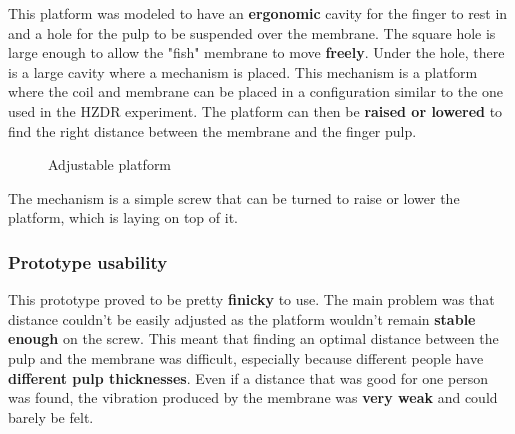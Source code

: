 This platform was modeled to have an \textbf{ergonomic} cavity for the finger to rest in and a hole for the pulp to be suspended over the membrane.
The square hole is large enough to allow the "fish" membrane to move \textbf{freely}.
Under the hole, there is a large cavity where a mechanism is placed.
This mechanism is a platform where the coil and membrane can be placed in a configuration similar to the one used in the HZDR experiment.
The platform can then be \textbf{raised or lowered} to find the right distance between the membrane and the finger pulp.
\begin{figure}[H]
    \centering
    \caption{Adjustable platform}
    \label{fig: adj_platform}
\end{figure}
The mechanism is a simple screw that can be turned to raise or lower the platform, which is laying on top of it.

\subsubsection{Prototype usability}
This prototype proved to be pretty \textbf{finicky} to use.
The main problem was that distance couldn't be easily adjusted as the platform wouldn't remain \textbf{stable enough} on the screw.
This meant that finding an optimal distance between the pulp and the membrane was difficult, especially because different people have \textbf{different pulp thicknesses}.
Even if a distance that was good for one person was found, the vibration produced by the membrane was \textbf{very weak} and could barely be felt.


